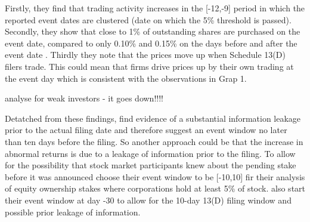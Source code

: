 \documentclass[12pt]{article}
\begin{document}
Firstly, they find that trading activity increases in the [-12,-9] period in which the reported event dates are clustered (date on which the 5\% threshold is passed). Secondly, they show that close to 1\% of outstanding shares are purchased on the event date, compared to only 0.10\% and 0.15\% on the days before and after the event date \citep[p.1561]{Collin-Dufresne2015}. Thirdly they note that the prices move up when Schedule 13(D) filers trade. This could mean that firms drive prices up by their own trading at the event day which is consistent with the observations in Grap 1.\\ 
\begin{center}
	analyse for weak investors - it goes down!!!! 
\end{center}

Detatched from these findings, \citet[p.31]{Brigida2012} find evidence of a substantial information leakage prior to the actual filing date and therefore suggest an event window no later than ten days before the filing. So another approach could be that the increase in abnormal returns is due to a leakage of information prior to the filing. To allow for the possibility that stock market participants knew about the pending stake before it was announced \citet[p.2802]{Allen2000} choose their event window to be [-10,10] fir their analysis of equity ownership stakes where corporations hold at least 5\% of stock. \citet[p.207]{Klein2009} also start their event window at day -30 to allow for the 10-day 13(D) filing window and possible prior leakage of information.  \citet{mcwilliams1999}

\end{document}
